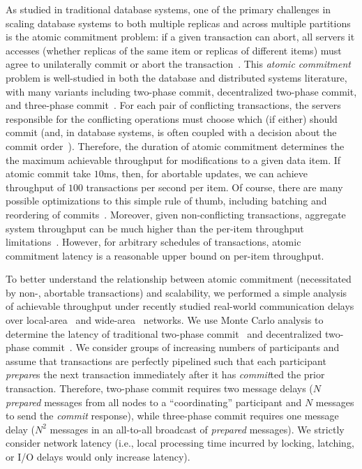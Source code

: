 As studied in traditional database systems, one of the primary
challenges in scaling database systems to both multiple replicas and
across multiple partitions is the atomic commitment problem: if a
given transaction can abort, all servers it accesses (whether replicas
of the same item or replicas of different items) must agree to
unilaterally commit or abort the
transaction~\cite{bernstein-book}. This \textit{atomic commitment}
problem is well-studied in both the database and distributed systems
literature, with many variants including two-phase commit,
decentralized two-phase commit, and three-phase
commit~\cite{atomictransactions,paxos-commit,traiger-tods}. For each
pair of conflicting transactions, the servers responsible for the
conflicting operations must choose which (if either) should commit
(and, in database systems, is often coupled with a decision about the
commit order~\cite{hat-vldb,calvin,traiger-tods}). Therefore, the
duration of atomic commitment determines the the maximum achievable
throughput for modifications to a given data item. If atomic commit
take $10$ms, then, for abortable updates, we can achieve throughput of
$100$ transactions per second per item. Of course, there are many
possible optimizations to this simple rule of thumb, including
batching and reordering of commits~\cite{calvin}. Moreover, given
non-conflicting transactions, aggregate system throughput can be much
higher than the per-item throughput limitations~\cite{spanner,
  f1}. However, for arbitrary schedules of transactions, atomic
commitment latency is a reasonable upper bound on per-item throughput.

To better understand the relationship between atomic commitment
(necessitated by non-\iconfluent, abortable transactions) and
scalability, we performed a simple analysis of achievable throughput
under recently studied real-world communication delays over
local-area~\cite{bobtail} and wide-area~\cite{hat-vldb} networks. We
use Monte Carlo analysis to determine the latency of traditional
two-phase commit~\cite{bernstein-book} and decentralized two-phase
commit~\cite{paxos-commit}. We consider groups of increasing numbers
of participants and assume that transactions are perfectly pipelined
such that each participant \textit{prepare}s the next transaction
immediately after it has \textit{commit}ted the prior
transaction. Therefore, two-phase commit requires two message delays
($N$ \textit{prepared} messages from all nodes to a ``coordinating''
participant and $N$ messages to send the \textit{commit} response),
while three-phase commit requires one message delay ($N^2$ messages in
an all-to-all broadcast of \textit{prepared} messages). We strictly
consider network latency (i.e., local processing time incurred by
locking, latching, or I/O delays would only increase latency).

